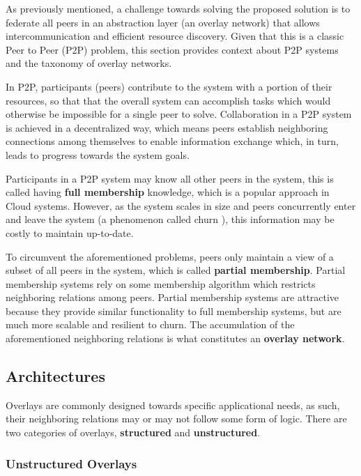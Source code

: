 

As previously mentioned, a challenge towards solving the proposed solution is to federate all peers in an abstraction layer (an overlay network) that allows intercommunication and efficient resource discovery. Given that this is a classic Peer to Peer (P2P) problem, this section provides context about P2P systems and the taxonomy of overlay networks.

In P2P, participants (peers) contribute to the system with a portion of their resources, so that that the overall system can accomplish tasks which would otherwise be impossible for a single peer to solve. Collaboration in a P2P system is achieved in a decentralized way, which means peers establish neighboring connections among themselves to enable information exchange which, in turn, leads to progress towards the system goals. 

Participants in a P2P system may know all other peers in the system, this is called having \textbf{full membership} knowledge, which is a popular approach in Cloud systems. However, as the system scales in size and peers concurrently enter and leave the system (a phenomenon called churn \cite{stutzbach2006understanding}), this information may be costly to maintain up-to-date. 

To circumvent the aforementioned problems, peers only maintain a view of a subset of all peers in the system, which is called \textbf{partial membership}. Partial membership systems rely on some membership algorithm which restricts neighboring relations among peers. Partial membership systems are attractive because they provide similar functionality to full membership systems, but are much more scalable and resilient to churn. The accumulation of the aforementioned neighboring relations is what constitutes an \textbf{overlay network}. 

\subsection{Architectures}

Overlays are commonly designed towards specific applicational needs, as such, their neighboring relations may or may not follow some form of logic. There are two categories of overlays, \textbf{structured} and \textbf{unstructured}.

\subsubsection{Unstructured Overlays}

